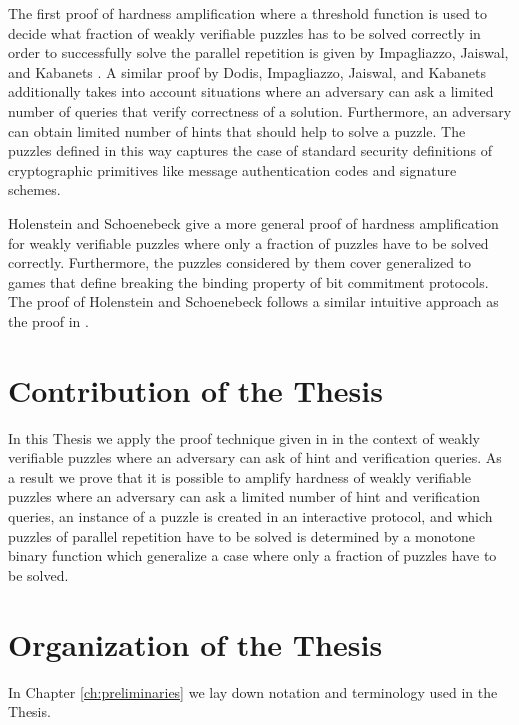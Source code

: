 \documentclass[11pt,a4paper,titlepage]{memoir}
\begin{document}
The first proof of hardness amplification where a threshold function is used to decide what fraction of weakly verifiable puzzles has to be solved correctly
in order to successfully solve the parallel repetition is given by Impagliazzo, Jaiswal, and Kabanets \cite{impagliazzo2007chernoff}.
A similar proof by Dodis, Impagliazzo, Jaiswal, and Kabanets \cite{Dodis:2009:SAI:1530441.1530450} additionally
takes into account situations where an adversary can ask a limited number of queries that verify correctness of a solution.
Furthermore, an adversary can obtain limited number of hints that should help to solve a puzzle.
The puzzles defined in this way captures the case of standard security definitions of cryptographic primitives
like message authentication codes and signature schemes.

Holenstein and Schoenebeck \cite{DBLP:journals/corr/abs-1002-3534} give a more general proof of hardness amplification
for weakly verifiable puzzles where only a fraction of puzzles have to be solved correctly.
Furthermore, the puzzles considered by them cover generalized to games that define breaking the binding property of bit commitment protocols.
The proof of Holenstein and Schoenebeck follows a similar intuitive approach as the proof in \cite{canetti2004hardness}.

\section{Contribution of the Thesis}
In this Thesis we apply the proof technique given in \cite{DBLP:journals/corr/abs-1002-3534}
in the context of weakly verifiable puzzles where an adversary can ask of hint and verification queries.
As a result we prove that it is possible to amplify hardness of weakly verifiable puzzles where an adversary
can ask a limited number of hint and verification queries, an instance of a puzzle is created in an interactive protocol,
and which puzzles of parallel repetition have to be solved is determined by a monotone binary function which generalize
a case where only a fraction of puzzles have to be solved.

\section{Organization of the Thesis}
In Chapter \ref{ch:preliminaries} we lay down notation and terminology used in the Thesis.
\end{document}
